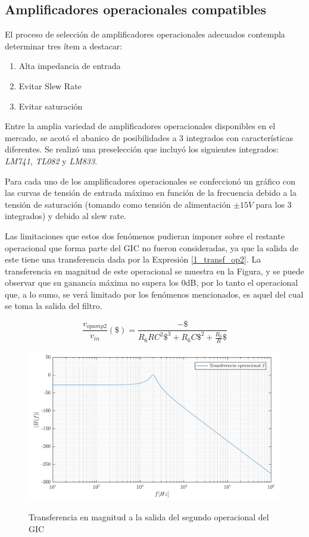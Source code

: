 \subsection{Amplificadores operacionales compatibles}
El proceso de selección de amplificadores operacionales adecuados contempla determinar tres ítem a destacar:

\begin{enumerate}
\item Alta impedancia de entrada
\item Evitar Slew Rate
\item Evitar saturación
\end{enumerate}

Entre la amplia variedad de amplificadores operacionales disponibles en el mercado, se acotó el abanico de posibilidades a 3 integrados con características diferentes. Se realizó una preselección que incluyó los siguientes integrados: \emph{LM741}, \emph{TL082} y \emph{LM833}.

Para cada uno de los amplificadores operacionales se confeccionó un gráfico con las curvas de tensión de entrada máximo en función de la frecuencia debido a la tensión de saturación (tomando como tensión de alimentación $\pm 15V$ para los 3 integrados) y debido al slew rate. 

Las limitaciones que estos dos fenómenos pudieran imponer sobre el restante operacional que forma parte del GIC no fueron consideradas, ya que la salida de este tiene una transferencia dada por la Expresión \ref{1_transf_op2}. La transferencia en magnitud de este operacional se muestra en la Figura, y se puede observar que su ganancia máxima no supera los 0dB, por lo tanto el operacional que, a lo sumo, se verá limitado por los fenómenos mencionados, es aquel del cual se toma la salida del filtro.

\begin{equation}
\frac{v_{opamp2}}{v_{in}}(\$) = \frac{-\$}{R_6RC^2\$^3 + R_6C\$^2 + \frac{R_6}{R}\$}
\label{1_transf_op2} 
\end{equation}

\begin{figure}[H]
\centering
\includegraphics[scale=0.4]{resources/bode_segundo_opamp}
\label{1_bode_opamp2}
\caption{Transferencia en magnitud a la salida del segundo operacional del GIC}
\end{figure}

